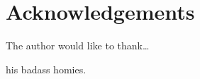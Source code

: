\chapter*{Acknowledgements} %

The author would like to thank\ldots

his badass homies.

% 
% 
% 
% 
% 
% 
